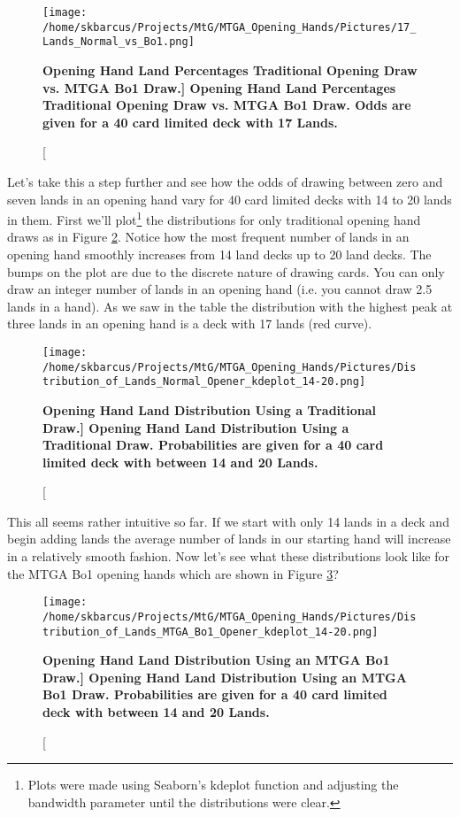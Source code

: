\documentclass[oneside]{book}   %
\begin{document}
 	\begin{figure}[!ht]
	\centering
	\centerline{\texttt{[image: /home/skbarcus/Projects/MtG/MTGA\_Opening\_Hands/Pictures/17\_Lands\_Normal\_vs\_Bo1.png]}}
	\caption[\bf{Opening Hand Land Percentages Traditional Opening Draw vs. MTGA Bo1 Draw.}]{
	{\bf{Opening Hand Land Percentages Traditional Opening Draw vs. MTGA Bo1 Draw.}} Odds are given for a 40 card limited deck with 17 Lands.}
	\label{fig:traditional_vs_bo1_17}
	\end{figure}	
	
Let's take this a step further and see how the odds of drawing between zero and seven lands in an opening hand vary for 40 card limited decks with 14 to 20 lands in them. First we'll plot\footnote{Plots were made using Seaborn's kdeplot function and adjusting the bandwidth parameter until the distributions were clear.} the distributions for only traditional opening hand draws as in Figure \ref{fig:traditional_distributions}. Notice how the most frequent number of lands in an opening hand smoothly increases from 14 land decks up to 20 land decks. The bumps on the plot are due to the discrete nature of drawing cards. You can only draw an integer number of lands in an opening hand (i.e. you cannot draw 2.5 lands in a hand). As we saw in the table the distribution with the highest peak at three lands in an opening hand is a deck with 17 lands (red curve).

 	\begin{figure}[!ht]
	\centering
	\centerline{\texttt{[image: /home/skbarcus/Projects/MtG/MTGA\_Opening\_Hands/Pictures/Distribution\_of\_Lands\_Normal\_Opener\_kdeplot\_14-20.png]}}
	\caption[\bf{Opening Hand Land Distribution Using a Traditional Draw.}]{
	{\bf{Opening Hand Land Distribution Using a Traditional Draw.}} Probabilities are given for a 40 card limited deck with between 14 and 20 Lands.}
	\label{fig:traditional_distributions}
	\end{figure}	

This all seems rather intuitive so far. If we start with only 14 lands in a deck and begin adding lands the average number of lands in our starting hand will increase in a relatively smooth fashion. Now let's see what these distributions look like for the MTGA Bo1 opening hands which are shown in Figure \ref{fig:bo1_distributions}? 

 	\begin{figure}[!ht]
	\centering
	\centerline{\texttt{[image: /home/skbarcus/Projects/MtG/MTGA\_Opening\_Hands/Pictures/Distribution\_of\_Lands\_MTGA\_Bo1\_Opener\_kdeplot\_14-20.png]}}
	\caption[\bf{Opening Hand Land Distribution Using an MTGA Bo1 Draw.}]{
	{\bf{Opening Hand Land Distribution Using an MTGA Bo1 Draw.}} Probabilities are given for a 40 card limited deck with between 14 and 20 Lands.}
	\label{fig:bo1_distributions}
	\end{figure}	
	
\end{document}
